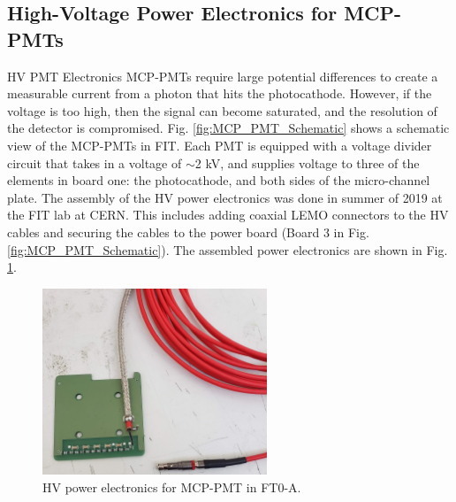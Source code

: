 \subsection{High-Voltage Power Electronics for MCP-PMTs}{HV PMT Electronics}
MCP-PMTs require large potential differences to create a measurable current from a photon that hits the photocathode. However, if the voltage is too high, then the signal can become saturated, and the resolution of the detector is compromised. Fig. \ref{fig:MCP_PMT_Schematic} shows a schematic view of the MCP-PMTs in FIT. Each PMT is equipped with a voltage divider circuit that takes in a voltage of $\sim$2 kV, and supplies voltage to three of the elements in board one: the photocathode, and both sides of the micro-channel plate. The assembly of the HV power electronics was done in summer of 2019 at the FIT lab at CERN. This includes adding coaxial LEMO connectors to the HV cables and securing the cables to the power board (Board 3 in Fig. \ref{fig:MCP_PMT_Schematic}). The assembled power electronics are shown in Fig. \ref{fig:power_board}.

\begin{figure}[H]
    \centering
    \includegraphics[width=0.6\textwidth]{figures/FIT/power_board.jpg}
    \caption{HV power electronics for MCP-PMT in FT0-A.}
    \label{fig:power_board}
\end{figure}

